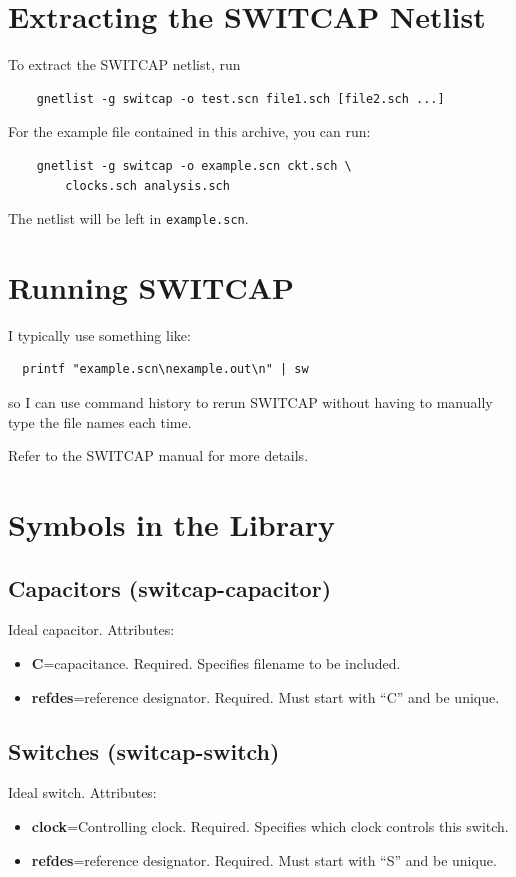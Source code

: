 \documentclass{article}
\begin{document}
\section{Extracting the SWITCAP Netlist}
To extract the SWITCAP netlist, run 
\begin{verbatim}
    gnetlist -g switcap -o test.scn file1.sch [file2.sch ...]
\end{verbatim}
For the example file contained in this archive, you can run: 
\begin{verbatim}
    gnetlist -g switcap -o example.scn ckt.sch \ 
        clocks.sch analysis.sch
\end{verbatim}

The netlist will be left in {\tt example.scn}.

\section{Running SWITCAP}
I typically use something like:
\begin{verbatim}
  printf "example.scn\nexample.out\n" | sw
\end{verbatim}
so I can use command history to rerun SWITCAP without having to
manually type the file names each time.

Refer to the SWITCAP manual for more details.

\appendix
\section{Symbols in the Library}

\subsection{Capacitors (switcap-capacitor)}
Ideal capacitor.
Attributes:
\begin{itemize}
\item {\bf C}=capacitance.  Required.  Specifies filename to be
  included.
\item {\bf refdes}=reference designator.  Required.  Must start with
  ``C'' and be unique.
\end{itemize}

\subsection{Switches (switcap-switch)}
Ideal switch.
Attributes:
\begin{itemize}
\item {\bf clock}=Controlling clock.  Required.  Specifies which clock
  controls this switch.
\item {\bf refdes}=reference designator.  Required.  Must start with
  ``S'' and be unique.
\end{itemize}
\end{document}
